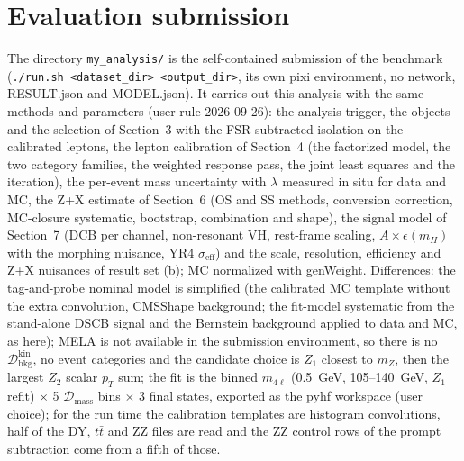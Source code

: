 \documentclass[11pt,a4paper]{article}
\begin{document}
\section{Evaluation submission}\label{sec:eval}
The directory \texttt{my\_analysis/} is the self-contained submission of the benchmark (\texttt{./run.sh <dataset\_dir> <output\_dir>}, its own pixi environment, no network, RESULT.json and MODEL.json).  It carries out this analysis with the same methods and parameters (user rule 2026-09-26): the analysis trigger, the objects and the selection of Section~3 with the FSR-subtracted isolation on the calibrated leptons, the lepton calibration of Section~4 (the factorized model, the two category families, the weighted response pass, the joint least squares and the iteration), the per-event mass uncertainty with $\lambda$ measured in situ for data and MC, the Z+X estimate of Section~6 (OS and SS methods, conversion correction, MC-closure systematic, bootstrap, combination and shape), the signal model of Section~7 (DCB per channel, non-resonant VH, rest-frame scaling, $A\times\epsilon(m_H)$ with the morphing nuisance, YR4 $\sigma_\mathrm{eff}$) and the scale, resolution, efficiency and Z+X nuisances of result set (b); MC normalized with genWeight.  Differences: the tag-and-probe nominal model is simplified (the calibrated MC template without the extra convolution, CMSShape background; the fit-model systematic from the stand-alone DSCB signal and the Bernstein background applied to data and MC, as here); MELA is not available in the submission environment, so there is no $\mathcal{D}^\mathrm{kin}_\mathrm{bkg}$, no event categories and the candidate choice is $Z_1$ closest to $m_Z$, then the largest $Z_2$ scalar $p_T$ sum; the fit is the binned $m_{4\ell}$ (0.5~GeV, 105--140~GeV, $Z_1$ refit) $\times$ 5 $\mathcal{D}_\mathrm{mass}$ bins $\times$ 3 final states, exported as the pyhf workspace (user choice); for the run time the calibration templates are histogram convolutions, half of the DY, $t\bar t$ and ZZ files are read and the ZZ control rows of the prompt subtraction come from a fifth of those.
\end{document}

